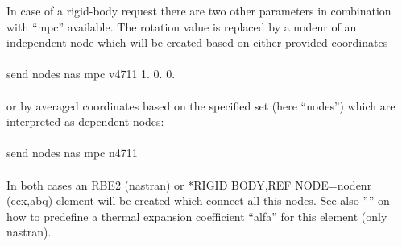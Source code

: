 \documentclass{article}
\begin{document}
In case of a rigid-body request there are two other parameters in combination with ``mpc'' available. The rotation value is replaced by a nodenr of an independent node which will be created based on either provided coordinates\\\\send nodes nas mpc v4711 1. 0. 0.\\\\or by averaged coordinates based on the specified set (here ``nodes'') which are interpreted as dependent nodes:\\\\send nodes nas mpc n4711\\\\In both cases an RBE2 (nastran) or *RIGID BODY,REF NODE=nodenr (ccx,abq) element will be created which connect all this nodes. See also '''' on how to predefine a thermal expansion coefficient ``alfa'' for this element (only nastran).\\\\
\end{document}
